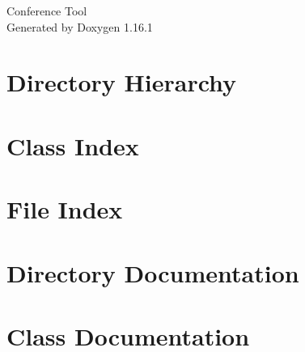 \documentclass[twoside]{book}
\newcommand{\+}{\discretionary{\mbox{\scriptsize$\hookleftarrow$}}{}{}}
\newcommand{\clearemptydoublepage}{%
    \newpage{\pagestyle{empty}\cleardoublepage}%
  }
\begin{document}
  \raggedbottom
    \hypersetup{pageanchor=false,
                bookmarksnumbered=true,
                pdfencoding=unicode
               }
  \begin{titlepage}
  \vspace*{7cm}
  \begin{center}%
  {\Large Conference Tool}\\
  \vspace*{1cm}
  {\large Generated by Doxygen 1.16.1}\\
  \end{center}
  \end{titlepage}
  \clearemptydoublepage
  \tableofcontents
  \clearemptydoublepage
  \hypersetup{pageanchor=true}
\chapter{Directory Hierarchy}

\chapter{Class Index}

\chapter{File Index}

\chapter{Directory Documentation}





\chapter{Class Documentation}



















\end{document}
